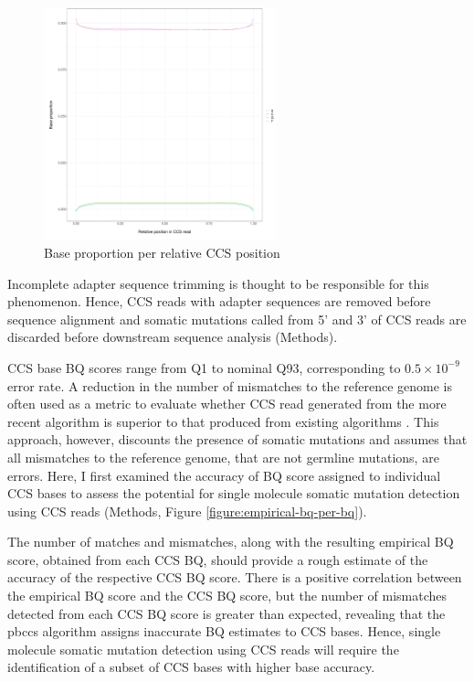 \begin{figure}[h!]
\caption{Base proportion per relative CCS position}
\label{figure:base-proportion-per-ccs-position}
\begin{centering}
\includegraphics[width=0.6\textwidth]{Vector/base_proportion_per_ccs_position.pdf}
\end{centering}
\end{figure}

Incomplete adapter sequence trimming is thought to be responsible for this phenomenon. Hence, CCS reads with adapter sequences are removed before sequence alignment and somatic mutations called from 5’ and 3’ of CCS reads are discarded before downstream sequence analysis (Methods). 

CCS base BQ scores range from Q1 to nominal Q93, corresponding to $0.5\times10^{-9}$ error rate. A reduction in the number of mismatches to the reference genome is often used as a metric to evaluate whether CCS read generated from the more recent algorithm is superior to that produced from existing algorithms \cite{Wenger2019-pw, Baid2022-or}. This approach, however, discounts the presence of somatic mutations and assumes that all mismatches to the reference genome, that are not germline mutations, are errors. Here, I first examined the accuracy of BQ score assigned to individual CCS bases to assess the potential for single molecule somatic mutation detection using CCS reads (Methods, Figure \ref{figure:empirical-bq-per-bq}). 

The number of matches and mismatches, along with the resulting empirical BQ score, obtained from each CCS BQ, should provide a rough estimate of the accuracy of the respective CCS BQ score. There is a positive correlation between the empirical BQ score and the CCS BQ score, but the number of mismatches detected from each CCS BQ score is greater than expected, revealing that the pbccs algorithm assigns inaccurate BQ estimates to CCS bases. Hence, single molecule somatic mutation detection using CCS reads will require the identification of a subset of CCS bases with higher base accuracy.

